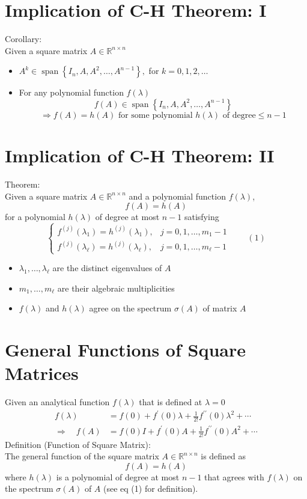 \documentclass[10pt,a4paper,oneside]{article}
\begin{document}
\section{Implication of C-H Theorem: I}
Corollary:\\
Given a square matrix $A\in \mathbb{R}^{n\times n}$
\begin{itemize}
\item $A^{k} \in \operatorname{span}\left\{I_{n}, A, A^{2}, \ldots, A^{n-1}\right\},$ for $k=0,1,2, \ldots$
\item For any polynomial function $f(\lambda)$
\[
f(A) \in \operatorname{span}\left\{I_{n}, A, A^{2}, \ldots, A^{n-1}\right\}
\]
\[
\Rightarrow f(A)=h(A) \text { for some polynomial } h(\lambda) \text { of } \text {degree} \leq n-1
\]
\end{itemize}
\section{Implication of C-H Theorem: II}
Theorem:\\
Given a square matrix $A\in\mathbb{R}^{n\times n}$ and a polynomial function $f(\lambda)$,
\[
f(A)=h(A)
\]
for a polynomial $h(\lambda)$ of degree at most $n-1$ satisfying
\[
\left\{\begin{array}{ll}{f^{(j)}\left(\lambda_{1}\right)=h^{(j)}\left(\lambda_{1}\right),} & {j=0,1, \ldots, m_{1}-1} \\ {f^{(j)}\left(\lambda_{\ell}\right)=h^{(j)}\left(\lambda_{\ell}\right),} & {j=0,1, \ldots, m_{\ell}-1}\end{array}\right.\quad\quad(1)
\]
\begin{itemize}
\item $\lambda_{1}, \ldots, \lambda_{\ell}$ are the distinct eigenvalues of $A$
\item $m_{1}, \ldots, m_{\ell}$ are their algebraic multiplicities
\item $f(\lambda)$ and $h(\lambda)$ agree on the spectrum $\sigma(A)$ of matrix $A$
\end{itemize}
\section{General Functions of Square Matrices}
Given an analytical function $f(\lambda)$ that is defined at $\lambda=0$
\[
\begin{aligned} f(\lambda) &=f(0)+f^{\prime}(0) \lambda+\frac{1}{2 !} f^{\prime \prime}(0) \lambda^{2}+\cdots \\ \Rightarrow \quad f(A) &=f(0) I+f^{\prime}(0) A+\frac{1}{2 !} f^{\prime \prime}(0) A^{2}+\cdots \end{aligned}
\]
Definition (Function of Square Matrix):\\
The general function of the square matrix $A \in \mathbb{R}^{n \times n}$ is defined as
\[
f(A)=h(A)
\]
where $h(\lambda)$ is a polynomial of degree at most $n-1$ that agrees with $f(\lambda)$
on the spectrum $\sigma(A)$ of $A$ (see eq (1) for definition).
\end{document}
